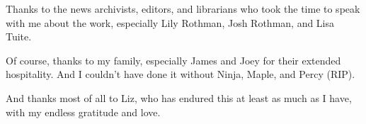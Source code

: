 Thanks to the news archivists, editors, and librarians who took the time to speak with me about the work, especially Lily Rothman, Josh Rothman, and Lisa Tuite.

Of course, thanks to my family, especially James and Joey for their extended hospitality. And I couldn't have done it without Ninja, Maple, and Percy (RIP).

And thanks most of all to Liz, who has endured this at least as much as I have, with my endless gratitude and love.

